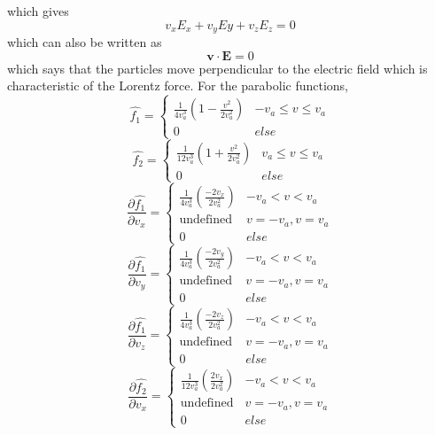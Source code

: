 \documentclass[12pt]{article}
\begin{document}
{	which gives
	$$v_{x} E_{x} + v_{y} E{y} + v_{z} E_{z} = 0$$
	which can also be written as 
	\begin{equation}
		\label{eqn:MaxwellInVlasov}
		\textbf{v} \cdot \mathrm{\textbf{E}} = 0
	\end{equation} 
	which says that the particles move perpendicular to the electric field which is characteristic of the Lorentz force.
	For the parabolic functions,
	\[ \hat{f_{1}} = 
	\begin{cases} 
		\frac{1}{4 v_{a}^{3}} \left(1 - \frac{v^{2}}{2 v_{a}^2}\right) & -v_{a}\leq v\leq v_{a} \\
		0 & else 
	\end{cases}
	\]
	\[ \hat{f_{2}} = 
	\begin{cases}
		\frac{1}{12 v_{a}^{3}} \left(1 + \frac{v^{2}}{2 v_{a}^2}\right) & v_{a}\leq v\leq v_{a} \\
		0 & else
	\end{cases}\] 
	\[ \frac{\displaystyle \partial \hat{f_{1}}}{\displaystyle \partial v_{x}} = 
	\begin{cases} 
		\frac{1}{4 v_{a}^{3}} \left(\frac{- 2 v_{x}}{2 v_{a}^2}\right) & -v_{a} < v < v_{a} \\
		\mathrm{undefined} & v = - v_{a}, v = v_{a} \\
		0 & else 
	\end{cases}
	\]
	\[ \frac{\displaystyle \partial \hat{f_{1}}}{\displaystyle \partial v_{y}} = 
	\begin{cases} 
		\frac{1}{4 v_{a}^{3}} \left(\frac{- 2 v_{y}}{2 v_{a}^2}\right) & -v_{a} < v < v_{a} \\
		\mathrm{undefined} & v = - v_{a}, v = v_{a} \\
		0 & else 
	\end{cases}
	\]
	\[ \frac{\displaystyle \partial \hat{f_{1}}}{\displaystyle \partial v_{z}} = 
	\begin{cases} 
		\frac{1}{4 v_{a}^{3}} \left(\frac{- 2 v_{z}}{2 v_{a}^2}\right) & -v_{a} < v < v_{a} \\
		\mathrm{undefined} & v = - v_{a}, v = v_{a} \\
		0 & else 
	\end{cases}
	\]
	\[ \frac{\displaystyle \partial \hat{f_{2}}}{\displaystyle \partial v_{x}} = 
	\begin{cases} 
		\frac{1}{12 v_{a}^{3}} \left(\frac{2 v_{x}}{2 v_{a}^2}\right) & -v_{a} < v < v_{a} \\
		\mathrm{undefined} & v = - v_{a}, v = v_{a} \\
		0 & else 

\end{cases}\]}
\end{document}
